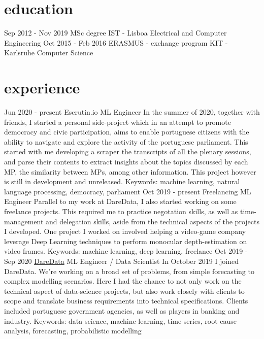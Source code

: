 \documentclass[]{colobas-cv}
\begin{document}
\section{education}
\entry
  {Sep 2012 - Nov 2019}
  {MSc degree}
  {IST - Lisboa}
  {Electrical and Computer Engineering}
\entry
  {Oct 2015 - Feb 2016}
  {ERASMUS - exchange program}
  {KIT - Karlsruhe}
  {Computer Science}

\section{experience}
\entry
  {Jun 2020 - present}
  {Escrutin.io}
  {ML Engineer}
  {In the summer of 2020, together with friends, I started a personal side-project
   which in an attempt to promote democracy and civic participation, aims to enable
   portuguese citizens with the ability to navigate and explore the activity of the
   portuguese parliament. This started with me developing a scraper
   the transcripts of all the plenary sessions, and parse their contents to extract insights
   about the topics discussed by each MP, the similarity between MPs, among other information.
   This project however is still in development and unreleased.
   Keywords: machine learning, natural language processing, democracy, parliament}
\entry
  {Oct 2019 - present}
  {Freelancing}
  {ML Engineer}
  {Parallel to my work at DareData, I also started working on some freelance projects.
   This required me to practice negotation skills, as well as time-management and delegation
   skills, aside from the technical aspects of the projects I developed. One project I worked
   on involved helping a video-game company leverage Deep Learning techniques to perform
   monocular depth-estimation on video frames.
   Keywords: machine learning, deep learning, freelance}
\entry
  {Oct 2019 - Sep 2020}
  {\href{https://daredata.engineering}{DareData}}
  {ML Engineer / Data Scientist}
  {In October 2019 I joined DareData. We're working on a broad set of problems,
  from simple forecasting to complex modelling scenarios. Here I had the chance
  to not only work on the technical aspect of data-science projects, but also
  work closely with clients to scope and translate business requirements into
  technical specifications. Clients included portuguese government agencies,
  as well as players in banking and industry.
  Keywords: data science, machine learning, time-series, root cause analysis, forecasting,
  probabilistic modelling}
\end{document}
